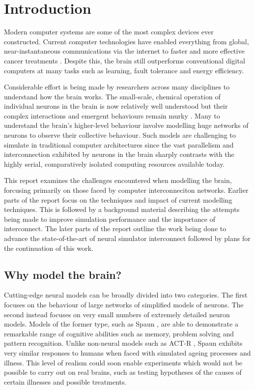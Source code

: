 \chapter{Introduction}
	
	Modern computer systems are some of the most complex devices ever constructed.
	Current computer technologies have enabled everything from global,
	near-instantaneous communications via the internet to faster and more
	effective cancer treatments \cite{nassif}. Despite this, the brain still
	outperforms conventional digital computers at many tasks such as learning,
	fault tolerance and energy efficiency.
	
	Considerable effort is being made by researchers across many disciplines to
	understand how the brain works. The small-scale, chemical operation of
	individual neurons in the brain is now relatively well understood but their
	complex interactions and emergent behaviours remain murky \cite{dayan03}. Many
	to understand the brain's higher-level behaviour involve modelling huge
	networks of neurons to observe their collective behaviour.  Such models are
	challenging to simulate in traditional computer architectures since the vast
	parallelism and interconnection exhibited by neurons in the brain sharply
	contrasts with the highly serial, comparatively isolated computing resources
	available today.
	
	This report examines the challenges encountered when modelling the brain,
	forcusing primarily on those faced by computer interconneciton networks.
	Earlier parts of the report focus on the techniques and impact of current
	modelling techniques. This is followed by a background material describing the
	attempts being made to improve simulation performance and the importance of
	interconnect. The later parts of the report outline the work being done to
	advance the state-of-the-art of neural simulator interconnect followed by
	plans for the continuation of this work.
	
	\section{Why model the brain?}
	
		Cutting-edge neural models can be broadly divided into two categories. The
		first focuses on the behaviour of large networks of simplified models of
		neurons.  The second instead focuses on very small numbers of extremely
		detailed neuron models.  Models of the former type, such as Spaun
		\cite{eliasmith12}, are able to demonstrate a remarkable range of cognitive
		abilities such as memory, problem solving and pattern recognition. Unlike
		non-neural models such as ACT-R \cite{anderson93}, Spaun exhibits very
		similar responses to humans when faced with simulated ageing processes and
		illness. This level of realism could soon enable experiments which would not
		be possible to carry out on real brains, such as testing hypotheses of the
		causes of certain illnesses and possible treatments.
		
